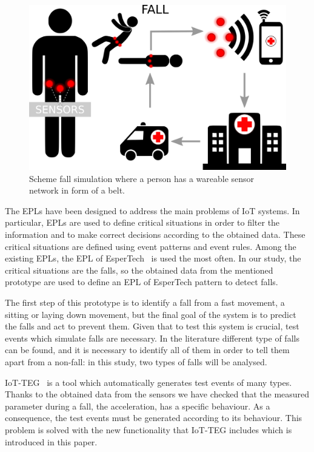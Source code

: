\documentclass[journal]{IEEEtran}
\begin{document}
\begin{figure}[!ht]
  \centering
  \includegraphics[scale=0.15]{img/Figure1}
  \caption[Escalation scheme]{Scheme fall simulation where a person has a wareable sensor network in form of a belt.~\cite{LaBlunda.2016,LaBlunda.2016b}}
  \label{fig:escalationscheme}
\end{figure}

The EPLs have been designed to address the main problems of 
IoT systems. In particular, EPLs are used to define critical situations in order to filter the 
information and to make correct decisions according to the obtained data. These critical 
situations are defined using event patterns and event rules. Among the existing EPLs, the 
EPL of EsperTech~\cite{Esper:2016} is used the most often. In our study, the critical situations are the falls,
so the obtained data from the mentioned prototype are used to define an EPL of EsperTech 
pattern to detect falls.

The first step of this prototype is to identify a fall from a fast movement, a sitting or laying 
down movement, but the final goal of the system is to predict the falls and act to prevent 
them. Given that to test this system is crucial, test events which simulate falls are necessary. In 
the literature different type of falls can be found, and it is necessary to identify all of them in 
order to tell them apart from a non-fall: in this study, two types of falls will be analysed. 

IoT-TEG~\cite{TesisGutierrez2017,Gutierrez2017} is a tool which automatically generates test events 
of many types. Thanks to the obtained data from the sensors we have checked that the measured 
parameter during a fall, the acceleration, has a specific behaviour. As a consequence, the test events 
must be generated according to its behaviour. This problem is solved with the new functionality that 
IoT-TEG includes which is introduced in this paper. %
\end{document}
